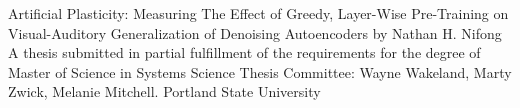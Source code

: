 \documentclass[12pt]{article}
\begin{document}
         


\begin{center}
\break \break \break \break 
Artificial Plasticity: Measuring The Effect of Greedy, Layer-Wise Pre-Training on Visual-Auditory Generalization of Denoising Autoencoders
\break\break\break\break \break \break \break \break \break 
by \break \break Nathan H. Nifong
\break\break\break\break \break \break \break \break \break 
A thesis submitted in partial fulfillment of the\break
requirements for the degree of
\break\break\break\break 
Master of Science \break in \break Systems Science
\break\break\break\break \break 
Thesis Committee: \break Wayne Wakeland, \break Marty Zwick, \break Melanie Mitchell.
\break\break\break\break 
Portland State University 
\end{center}

\begin{singlespacing}
\tableofcontents
\end{singlespacing}
\end{document}
